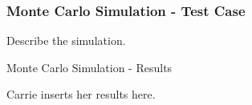 \begin{frame}
   \frametitle{Monte Carlo Simulation - Test Case}

   Describe the simulation.

\end{frame}

\begin{frame}{Monte Carlo Simulation - Results}

Carrie inserts her results here. 

\end{frame}